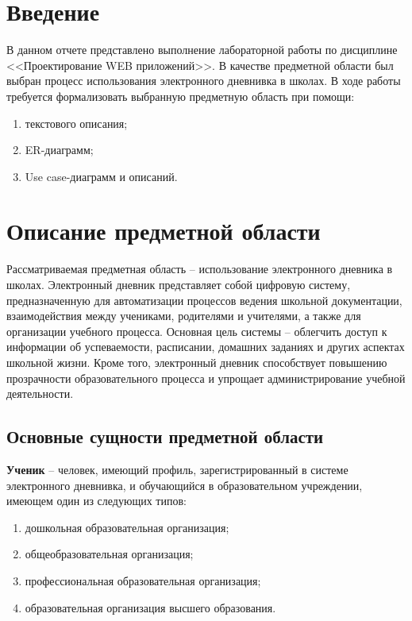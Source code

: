 \documentclass[a4paper, final]{article}
\begin{document}
\newpage

\tableofcontents

\newpage

\cleardoublepage
{}

\section*{Введение}
В данном отчете представлено выполнение лабораторной работы по дисциплине <<Проектирование WEB приложений>>. В качестве предметной области был выбран процесс использования электронного дневнивка в школах.
В ходе работы требуется формализовать выбранную предметную область при помощи:
\begin{enumerate}
    \item текстового описания;
    \item ER-диаграмм;
    \item Use case-диаграмм и описаний.
\end{enumerate}

\newpage
\section{Описание предметной области}

Рассматриваемая предметная область -- использование электронного дневника в школах. Электронный дневник представляет собой цифровую систему, предназначенную для автоматизации процессов ведения школьной документации, взаимодействия между учениками, родителями и учителями, а также для организации учебного процесса. Основная цель системы -- облегчить доступ к информации об успеваемости, расписании, домашних заданиях и других аспектах школьной жизни. Кроме того, электронный дневник способствует повышению прозрачности образовательного процесса и упрощает администрирование учебной деятельности.

\subsection{Основные сущности предметной области}

\textbf{Ученик} -- человек, имеющий профиль, зарегистрированный в системе электронного дневнивка, и обучающийся в образовательном учреждении, имеющем один из следующих типов:
\begin{enumerate}
  \item дошкольная образовательная организация;
  \item общеобразовательная организация;
  \item профессиональная образовательная организация;
  \item образовательная организация высшего образования.
\end{enumerate}
\end{document}
